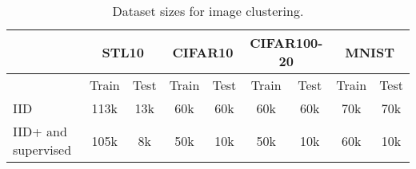 \begin{table}[t]
\fontsize{5.8}{8} \selectfont 
\centering
\begin{tabular}{l | c | c | c | c | c | c | c | c}
\hline
&  \multicolumn{2}{c}{STL10} 
&  \multicolumn{2}{c}{CIFAR10}
&  \multicolumn{2}{c}{CIFAR100-20}
&  \multicolumn{2}{c}{MNIST}\\
\hline 
& Train & Test & Train & Test & Train & Test & Train & Test \\
\hline
IID & 113k & 13k & 60k & 60k & 60k & 60k & 70k & 70k \\
IID+ and supervised & 105k & 8k & 50k & 10k & 50k & 10k & 60k & 10k\\
\hline
\end{tabular}
\caption{Dataset sizes for image clustering.}\label{t:imgclus-datasets}
\end{table}
